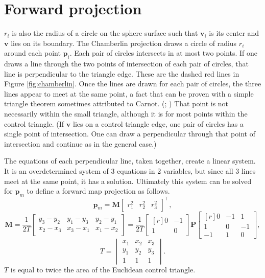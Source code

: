 \documentclass[]{interact}
\begin{document}
\section{Forward projection}

$r_i$ is also the radius of a circle on the sphere surface such that
$\mathbf v_i$ is its center and $\mathbf v$ lies on its boundary. The Chamberlin
projection draws a circle of radius $r_i$ around each point $\mathbf p_i$. Each
pair of circles intersects in at most two points. If one draws a
line through the two points of intersection of each pair of circles, that line
is perpendicular to the triangle edge. These are the dashed red lines in Figure
\ref{fig:chamberlin}. Once the lines are drawn for each pair of circles, the
three lines appear to meet at the same point, a fact that can be proven with a
simple triangle theorem sometimes attributed to Carnot. (\citealp{posamentier};
\citealp{wohlgemuth}) That point is not necessarily within the small triangle,
although it is for most points within the control triangle. (If $\mathbf v$ lies
on a control triangle edge, one pair of circles has a single point of
intersection. One can draw a perpendicular through that point of
intersection and continue as in the general case.)

The equations of each perpendicular line, taken together, create a linear
system. It is an overdetermined system of 3 equations in 2 variables, but since
all 3 lines meet at the same point, it has a solution. Ultimately this system
can be solved for $\mathbf p_m$ to define a forward map projection as follows.
\begin{equation}\label{eq:forward}
\mathbf p_m =
\mathbf M \begin{bmatrix*} r^2_1 & r^2_2 & r^2_3 \end{bmatrix*}^\top,
\end{equation}
\begin{equation}\label{eq:forwardm}
\mathbf M = \frac{1}{2T}
\begin{bmatrix*} y_3 - y_2 & y_1 - y_3 & y_2 - y_1 \\
x_2 - x_3 & x_3 - x_1 & x_1 - x_2 \end{bmatrix*} = \frac{1}{2T}
\begin{bmatrix*}[r] 0 & -1  \\
1 & 0 \end{bmatrix*}
\mathbf P
\begin{bmatrix*}[r] 0 & -1 & 1 \\
1 & 0 & -1 \\
-1 & 1 & 0 \end{bmatrix*},
\end{equation}
\begin{equation}\label{eq:forwardt}
T = \begin{vmatrix*} x_1 & x_2 & x_3 \\
 y_1 & y_2 & y_3 \\
 1 & 1 & 1
\end{vmatrix*}.
\end{equation}
$T$ is equal to twice the area of the Euclidean control triangle.
\end{document}
